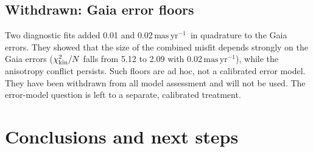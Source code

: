 \documentclass[11pt,a4paper]{article}
\newcommand{\masyr}{\ensuremath{\,\mathrm{mas\,yr^{-1}}}\xspace}
\newcommand{\chikin}{\ensuremath{\chi^2_{\rm kin}}\xspace}
\begin{document}
\subsection*{Withdrawn: Gaia error floors}
\label{sec:floors}
Two diagnostic fits added 0.01 and 0.02\masyr\ in quadrature to the Gaia
errors. They showed that the size of the combined misfit depends strongly on
the Gaia errors ($\chikin/N$ falls from 5.12 to 2.09 with 0.02\masyr),
while the anisotropy conflict persists. Such floors are ad hoc, not a
calibrated error model. They have been withdrawn from all model assessment
and will not be used. The error-model question is left to a separate,
calibrated treatment.

\section{Conclusions and next steps}
\label{sec:conclusions}
\end{document}
